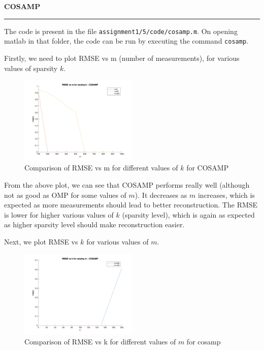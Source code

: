 \documentclass[a4paper,12pt]{article}
\newenvironment{solution}[2][]{%
    \begin{mdframed}[linecolor=blue!70!black, linewidth=2pt, roundcorner=10pt, backgroundcolor=yellow!10!white, skipabove=12pt, skipbelow=12pt]%
        \textbf{\large #2}
        \par\noindent\rule{\textwidth}{0.4pt}
}{
    \end{mdframed}
}
\begin{document}
\begin{solution}{COSAMP}
    The code is present in the file \texttt{assignment1/5/code/cosamp.m}. On opening matlab in that folder, the code can be run by executing the command \texttt{cosamp}.
    
    Firstly, we need to plot RMSE vs m (number of measurements), for various values of sparsity $k$. 
    
    \begin{figure}[H]
      \centering
      \includegraphics[width=0.5\textwidth]{../images/cosamp/cosamp_k.png}
      \caption{Comparison of RMSE vs m for different values of $k$ for COSAMP}
      \label{fig:rmse_comparison}
    \end{figure}
    
    From the above plot, we can see that COSAMP performs really well (although not as good as OMP for some values of $m$). It decreases as $m$ increases, which is expected as more measurements should lead to better reconstruction. The RMSE is lower for higher various values of $k$ (sparsity level), which is again as expected as higher sparsity level should make reconstruction easier.
    
    
    Next, we plot RMSE vs $k$ for various values of $m$.
    
    \begin{figure}[H]
      \centering
      \includegraphics[width=0.5\textwidth]{../images/cosamp/cosamp_m.png}
      \caption{Comparison of RMSE vs k for different values of $m$ for cosamp}
      \label{fig:rmse_comparison2}
    \end{figure}
    

\end{solution}
\end{document}
